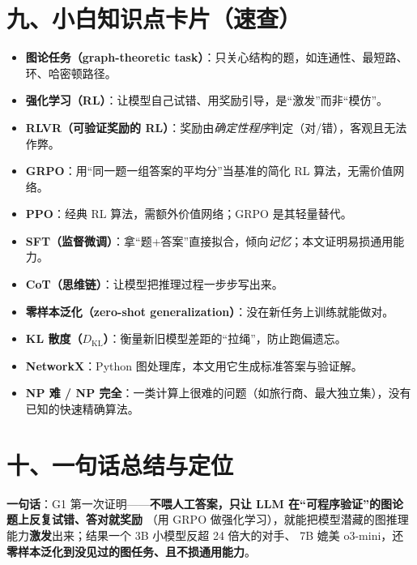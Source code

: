 \documentclass[11pt,UTF8,fontset=fandol]{ctexart}
\begin{document}
\section{九、小白知识点卡片（速查）}
\begin{itemize}[leftmargin=2em]
  \item \textbf{图论任务（graph-theoretic task）}：只关心结构的题，如连通性、最短路、环、哈密顿路径。
  \item \textbf{强化学习（RL）}：让模型自己试错、用奖励引导，是“激发”而非“模仿”。
  \item \textbf{RLVR（可验证奖励的 RL）}：奖励由\emph{确定性程序}判定（对/错），客观且无法作弊。
  \item \textbf{GRPO}：用“同一题一组答案的平均分”当基准的简化 RL 算法，无需价值网络。
  \item \textbf{PPO}：经典 RL 算法，需额外价值网络；GRPO 是其轻量替代。
  \item \textbf{SFT（监督微调）}：拿“题+答案”直接拟合，倾向\emph{记忆}；本文证明易损通用能力。
  \item \textbf{CoT（思维链）}：让模型把推理过程一步步写出来。
  \item \textbf{零样本泛化（zero-shot generalization）}：没在新任务上训练就能做对。
  \item \textbf{KL 散度（$D_{\mathrm{KL}}$）}：衡量新旧模型差距的“拉绳”，防止跑偏遗忘。
  \item \textbf{NetworkX}：Python 图处理库，本文用它生成标准答案与验证解。
  \item \textbf{NP 难 / NP 完全}：一类计算上很难的问题（如旅行商、最大独立集），没有已知的快速精确算法。
\end{itemize}

\section{十、一句话总结与定位}

\textbf{一句话}：G1 第一次证明——\textbf{不喂人工答案，只让 LLM 在“可程序验证”的图论题上反复试错、答对就奖励}
（用 GRPO 做强化学习），就能把模型潜藏的图推理能力\textbf{激发}出来；结果一个 3B 小模型反超 24 倍大的对手、
7B 媲美 o3-mini，还\textbf{零样本泛化到没见过的图任务、且不损通用能力}。
\end{document}
